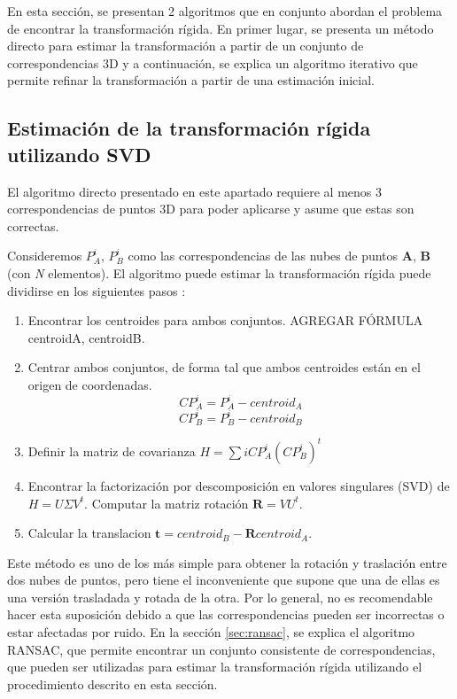 En esta sección, se presentan 2 algoritmos que en conjunto abordan el problema de encontrar la transformación rígida. En primer lugar, se presenta un método directo para estimar la transformación a partir de un conjunto de correspondencias 3D y a continuación, se explica un algoritmo iterativo que permite refinar la transformación a partir de una estimación inicial.

\subsection{Estimación de la transformación rígida utilizando SVD}
El algoritmo directo presentado en este apartado requiere al menos 3 correspondencias de puntos 3D para poder aplicarse y asume que estas son correctas.

Consideremos $ P_{A}^{i} $, $ P_{B}^{i} $ como las correspondencias de las nubes de puntos \textbf{A}, \textbf{B} (con \textsl{N} elementos).
El algoritmo puede estimar la transformación rígida puede dividirse en los siguientes pasos :
\begin{enumerate}

\item Encontrar los centroides para ambos conjuntos. 
AGREGAR FÓRMULA centroidA, centroidB.

\item Centrar ambos conjuntos, de forma tal que ambos centroides están en el origen de coordenadas. 
\begin{equation}
CP_{A}^{i} = P_{A}^{i} - centroid_{A}
\end{equation}
\begin{equation}
CP_{B}^{i} = P_{B}^{i} - centroid_{B} 
\end{equation}

\item Definir la matriz de covarianza $ H = \sum{i} CP_{A}^{i} (CP_{B}^{i})^{t} $

\item Encontrar la factorización por descomposición en valores singulares (SVD) \cite{wiki-svd} de 
$ H = U \Sigma V^{t} $. Computar la matriz rotación $ \textbf{R} = V U^{t} $.

\item Calcular la translacion $ \textbf{t} = centroid_{B} - \textbf{R} centroid_{A} $.

\end{enumerate}

Este método es uno de los más simple para obtener la rotación y traslación entre dos nubes de puntos, pero tiene el inconveniente que supone que una de ellas es una versión trasladada y rotada de la otra. Por lo general, no es recomendable hacer esta suposición debido a que las correspondencias pueden ser incorrectas o estar afectadas por ruido. En la sección \ref{sec:ransac}, se explica el algoritmo RANSAC, que permite encontrar un conjunto consistente de correspondencias, que pueden ser utilizadas para estimar la transformación rígida utilizando el procedimiento descrito en esta sección.

